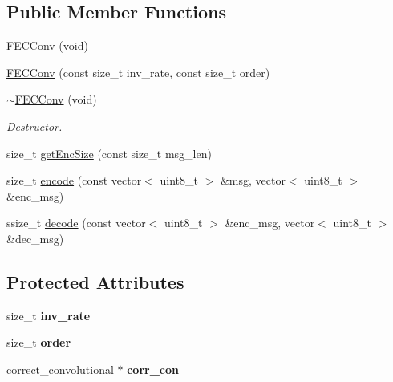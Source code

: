 \subsection*{Public Member Functions}
\begin{DoxyCompactItemize}
\item 
\hyperlink{classFECConv_ac0159362b45b9f7840e3bf7223cd6e48}{F\+E\+C\+Conv} (void)
\item 
\hyperlink{classFECConv_a884d27178ca0484f4692b78fa31fd898}{F\+E\+C\+Conv} (const size\+\_\+t inv\+\_\+rate, const size\+\_\+t order)
\item 
\mbox{\label{classFECConv_a021d8db3fb79146d02b99015e4678ba4}} 
\hyperlink{classFECConv_a021d8db3fb79146d02b99015e4678ba4}{$\sim$\+F\+E\+C\+Conv} (void)
\begin{DoxyCompactList}\small\item\em Destructor. \end{DoxyCompactList}\item 
size\+\_\+t \hyperlink{classFECConv_a3b49acf69440d2677e3181513b9f3592}{get\+Enc\+Size} (const size\+\_\+t msg\+\_\+len)
\item 
size\+\_\+t \hyperlink{classFECConv_ae3e796d0e026dca718ed6384653a4564}{encode} (const vector$<$ uint8\+\_\+t $>$ \&msg, vector$<$ uint8\+\_\+t $>$ \&enc\+\_\+msg)
\item 
ssize\+\_\+t \hyperlink{classFECConv_afd897d6756bbbe4874942654e91a95e3}{decode} (const vector$<$ uint8\+\_\+t $>$ \&enc\+\_\+msg, vector$<$ uint8\+\_\+t $>$ \&dec\+\_\+msg)
\end{DoxyCompactItemize}
\subsection*{Protected Attributes}
\begin{DoxyCompactItemize}
\item 
\mbox{\label{classFECConv_adbb15dc1ad17f9613559aa2527892be1}} 
size\+\_\+t {\bfseries inv\+\_\+rate}
\item 
\mbox{\label{classFECConv_aeb8954d7d5bd977494cca5a6a35a9dbc}} 
size\+\_\+t {\bfseries order}
\item 
\mbox{\label{classFECConv_a0978a376b15f30e89b8db481e229e0c7}} 
correct\+\_\+convolutional $\ast$ {\bfseries corr\+\_\+con}
\end{DoxyCompactItemize}
